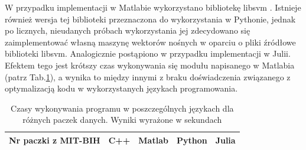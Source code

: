 W przypadku implementacji w Matlabie wykorzystano bibliotekę libsvm \cite{csie}. Istnieje również wersja tej biblioteki przeznaczona do wykorzystania w Pythonie, jednak po licznych, nieudanych próbach wykorzystania jej zdecydowano się zaimplementować własną maszynę wektorów nośnych w oparciu o pliki źródłowe biblioteki libsvm. Analogicznie postąpiono w przypadku implementacji w Julii. Efektem tego jest krótszy czas wykonywania się modułu napisanego w Matlabia (patrz Tab.\ref{tabResults}), a wynika to między innymi z braku doświadczenia związanego z optymalizacją kodu w wykorzystanych językach programowania.

\begin{table}[!tp]
	\centering
	\caption{Czasy wykonywania programu w poszczególnych językach dla różnych paczek danych. Wyniki wyrażone w sekundach}
	\label{tabResults}
	\begin{tabular}{|c|c|c|c|c|}
		\hline
		Nr paczki z MIT-BIH & C++ & Matlab & Python & Julia\\ \hline		
		

\end{tabular}
\end{table}
